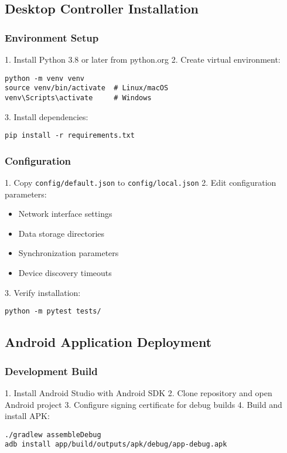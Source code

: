 \subsection{Desktop Controller Installation}

\subsubsection{Environment Setup}

1. Install Python 3.8 or later from python.org
2. Create virtual environment:
\begin{verbatim}
python -m venv venv
source venv/bin/activate  # Linux/macOS
venv\Scripts\activate     # Windows
\end{verbatim}

3. Install dependencies:
\begin{verbatim}
pip install -r requirements.txt
\end{verbatim}

\subsubsection{Configuration}

1. Copy \texttt{config/default.json} to \texttt{config/local.json}
2. Edit configuration parameters:
\begin{itemize}
\item Network interface settings
\item Data storage directories
\item Synchronization parameters
\item Device discovery timeouts
\end{itemize}

3. Verify installation:
\begin{verbatim}
python -m pytest tests/
\end{verbatim}

\subsection{Android Application Deployment}

\subsubsection{Development Build}

1. Install Android Studio with Android SDK
2. Clone repository and open Android project
3. Configure signing certificate for debug builds
4. Build and install APK:
\begin{verbatim}
./gradlew assembleDebug
adb install app/build/outputs/apk/debug/app-debug.apk
\end{verbatim}

